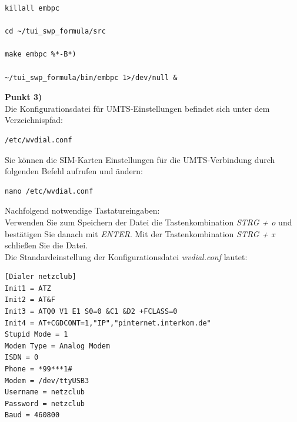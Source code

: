 \documentclass[fontsize = 12pt, paper = a4]{scrreprt}
\begin{document}
\newpage

\begin{lstlisting}[frame=single]
killall embpc

cd ~/tui_swp_formula/src
	
make embpc %*-B*)

~/tui_swp_formula/bin/embpc 1>/dev/null &
\end{lstlisting} 
\vspace*{-2mm}

\textbf{Punkt 3)} \\	

Die Konfigurationsdatei für UMTS-Einstellungen befindet sich unter dem Verzeichnispfad:

\vspace*{4mm}
\begin{lstlisting}[frame=single]
/etc/wvdial.conf
\end{lstlisting} 
\vspace*{-2mm}

Sie können die SIM-Karten Einstellungen für die UMTS-Verbindung durch folgenden Befehl aufrufen und ändern:

\vspace*{4mm}
\begin{lstlisting}[frame=single]
nano /etc/wvdial.conf
\end{lstlisting} 
\vspace*{-2mm}

Nachfolgend notwendige Tastatureingaben: \\

Verwenden Sie zum Speichern der Datei die Tastenkombination \textit{STRG + o} und bestätigen Sie danach mit \textit{ENTER}. Mit der Tastenkombination \textit{STRG + x} schließen Sie die Datei. \\

Die Standardeinstellung der Konfigurationsdatei \textit{wvdial.conf} lautet:

\vspace*{4mm}
\begin{lstlisting}[frame=single]
[Dialer netzclub]
Init1 = ATZ
Init2 = AT&F
Init3 = ATQ0 V1 E1 S0=0 &C1 &D2 +FCLASS=0
Init4 = AT+CGDCONT=1,"IP","pinternet.interkom.de"
Stupid Mode = 1
Modem Type = Analog Modem
ISDN = 0
Phone = *99***1#
Modem = /dev/ttyUSB3
Username = netzclub
Password = netzclub
Baud = 460800
\end{lstlisting} 
\vspace*{-2mm}
\end{document}
